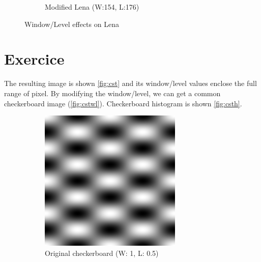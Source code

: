 \documentclass[12pt,english]{article}
\renewcommand{\thesection}{Exercice~\arabic{section}}
\begin{document}
\begin{figure}
\begin{subfigure}[t]{0.4\textwidth}
	 	\caption{Modified Lena (W:154, L:176)}
	 	\label{fig:lenad}
	 \end{subfigure}
	 \caption{Window/Level effects on Lena}
	 \label{fig:wllena}
\end{figure}


\section[]{\thesection}
The resulting image is shown \autoref{fig:cst} and its window/level values enclose the full range of pixel. By modifying the window/level, we can get a common checkerboard image (\autoref{fig:cstwl}). Checkerboard histogram is shown \autoref{fig:csth}.

\begin{figure}
	\centering
	\begin{subfigure}[t]{0.4\textwidth}
		\centering
		\includegraphics[width=.9\textwidth]{img/cst}
		\caption{Original checkerboard (W: 1, L: 0.5)}
		\label{fig:cst}
	\end{subfigure}%
	\qquad
	\begin{subfigure}[t]{0.4\textwidth}
		\centering

\end{subfigure}
\end{figure}
\end{document}
